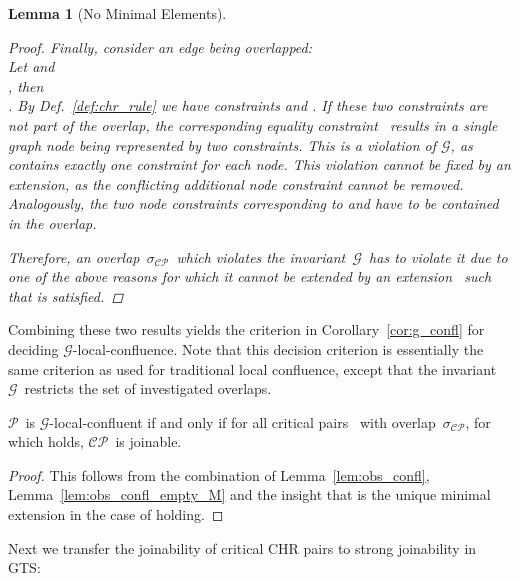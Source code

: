 \documentclass{tlp}
\newtheorem{lemma}[theorem]{Lemma}
\newcommand{\mcCP}{\ensuremath{\mathcal{CP}}}
\newcommand{\mcG}{\ensuremath{\mathcal{G}}}
\newcommand{\mcP}{\ensuremath{\mathcal{P}}}
\newcommand{\sigcp}{\ensuremath{\sigma_{\mcCP}}}
\begin{document}
\begin{lemma}[No Minimal Elements]
\begin{proof}
Finally, consider an edge being overlapped:\\
Let  and\\
, then\\
. By Def.~\ref{def:chr_rule} we have
constraints  and
. If these two
constraints are not part of the overlap, the corresponding equality
constraint~ results in a single graph
node being represented by two constraints. This is a violation of \mcG, as
 contains exactly one constraint for each node. This violation
cannot be fixed by an extension, as the conflicting additional node constraint
cannot be removed. Analogously, the two node constraints corresponding to
 and  have to be contained in the overlap.

Therefore, an overlap~\sigcp\ which violates the invariant~\mcG\ has to violate
it due to one of the above reasons for which it cannot be extended by an
extension~ such that  is satisfied.
\end{proof}

\end{lemma}

Combining these two results yields the criterion in Corollary~\ref{cor:g_confl}
for deciding \mcG-local-confluence. Note that this decision criterion is
essentially the same criterion as used for traditional local confluence, except
that the invariant~\mcG\ restricts the set of investigated overlaps.

\begin{corollary}[Deciding \mcG-Local-Confluence]\label{cor:g_confl}

\mcP\ is \mcG-local-confluent if and only if for all critical pairs~ with overlap~\sigcp, for which  holds, \mcCP\
is joinable.
\begin{proof}

This follows from the combination of Lemma~\ref{lem:obs_confl},
Lemma~\ref{lem:obs_confl_empty_M} and the insight that  is
the unique minimal extension in the case of  holding.
\end{proof}
\end{corollary}

Next we transfer the joinability of critical CHR pairs to strong joinability in
GTS:
\end{document}
